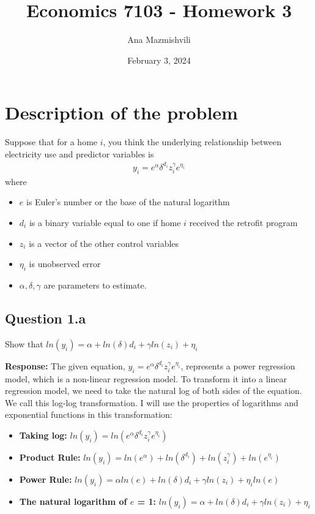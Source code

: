 \documentclass{article}
\title{Economics 7103 - Homework 3}
\author{Ana Mazmishvili}
\date{ February 3, 2024 }
\begin{document}
  
\maketitle 
\section{Description of the problem}
Suppose that for a home \(i\), you think the underlying relationship between electricity use and predictor
variables is 
\begin{align} 
     y_i= e^{\alpha} \delta^{d_i} z_i^\gamma e^{\eta_i} 
\end{align}
where 
\begin{itemize}
    \item \(e\) is Euler’s number or the base of the natural logarithm 
    \item \(d_i\) is a binary variable equal to one if home \(i\) received the retrofit program
    \item \(z_i\) is a vector of the other control variables
    \item \(\eta_i\) is unobserved error 
    \item \({\alpha, \delta, \gamma}\) are parameters to estimate.
\end{itemize}

\subsection*{Question 1.a} 
Show that \(ln(y_i)= \alpha + ln(\delta)d_i + \gamma ln(z_i) + \eta_i\)

\textbf{Response:} 
The given equation, \(y_i= e^{\alpha} \delta^{d_i} z_i^\gamma e^{\eta_i}\), represents a power regression model, which is a non-linear regression model. To transform it into a linear regression model, we need to take the natural log of both sides of the equation. We call this log-log transformation. I will use the properties of logarithms and exponential functions in this transformation:
\begin{itemize}
    \item \textbf{Taking log:} \(ln(y_i)= ln(e^{\alpha} \delta^{d_i} z_i^\gamma e^{\eta_i})\)
    \item \textbf{Product Rule:} \(ln(y_i)= ln(e^{\alpha})+ln(\delta^{d_i}) + ln(z_i^\gamma)+ln(e^{\eta_i})\)
    \item \textbf{Power Rule:} \(ln(y_i)= \alpha ln(e)+ln(\delta)d_i + \gamma ln(z_i) +\eta_iln(e)\)
    \item \textbf{The natural logarithm of \(e\) = 1:} \(ln(y_i)= \alpha + ln(\delta)d_i + \gamma ln(z_i) + \eta_i\)      
\end{itemize}
\end{document}
